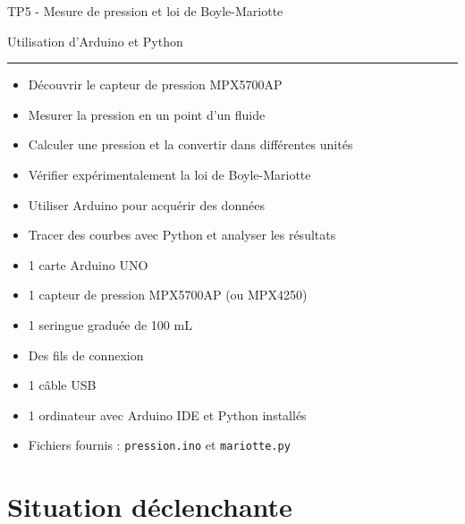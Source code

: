 \documentclass[11pt,a4paper]{article}
\begin{document}
\begin{center}
 \LARGE{TP5 - Mesure de pression et loi de Boyle-Mariotte}
 
 \large{Utilisation d'Arduino et Python}
\end{center}

\vspace{3 mm}

\normalsize

\hrule




\begin{objectifsbox}
\begin{itemize}[leftmargin=*]
    \item Découvrir le capteur de pression MPX5700AP
    \item Mesurer la pression en un point d'un fluide
    \item Calculer une pression et la convertir dans différentes unités
    \item Vérifier expérimentalement la loi de Boyle-Mariotte
    \item Utiliser Arduino pour acquérir des données
    \item Tracer des courbes avec Python et analyser les résultats
\end{itemize}
\end{objectifsbox}



\begin{materielbox}
\begin{itemize}[leftmargin=*]
    \item 1 carte Arduino UNO
    \item 1 capteur de pression MPX5700AP (ou MPX4250)
    \item 1 seringue graduée de 100 mL
    \item Des fils de connexion
    \item 1 câble USB
    \item 1 ordinateur avec Arduino IDE et Python installés
    \item Fichiers fournis : \texttt{pression.ino} et \texttt{mariotte.py}
\end{itemize}
\end{materielbox}



\section*{Situation déclenchante}
\end{document}

